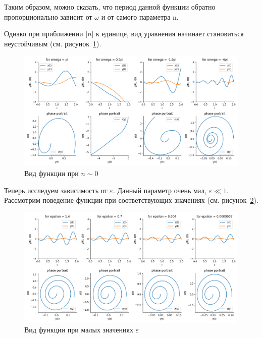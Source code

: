 \documentclass[a4paper,12pt]{article}
\begin{document}
	\newpage
	Таким образом, можно сказать, что период данной функции 
	обратно пропорционально зависит от $\omega$ и от самого параметра n.

	Однако при приближении $|n|$ к единице, вид уравнения начинает 
	становиться неустойчивым (см. рисунок~\ref{fig:fig12}).

	\begin{figure}[ht!]
		\begin{center}
		\includegraphics[scale=0.5]{figures/omeg1.png}
		\end{center}
		\vspace*{-8mm}
		\caption{Вид функции при $n\sim0$}\label{fig:fig12}
  	\end{figure}

	Теперь исследуем зависимость от $\varepsilon$. Данный параметр очень 
	мал, $\varepsilon \ll 1$. Рассмотрим поведение 
	функции при соответствующих значениях (см. рисунок~\ref{fig:fig13}).

	\begin{figure}[ht!]
		\begin{center}
		\includegraphics[scale=0.48]{figures/eps1.png}
		\end{center}
		\vspace*{-8mm}
		\caption{Вид функции при малых значениях $\varepsilon$}\label{fig:fig13}
  	\end{figure}
\end{document}
